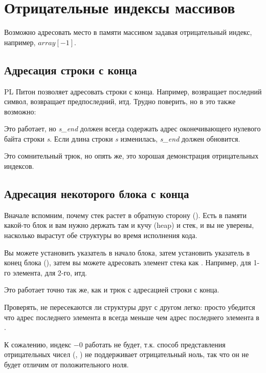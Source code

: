 \section{Отрицательные индексы массивов}
\label{negative_array_indices}

Возможно адресовать место в памяти  массивом задавая отрицательный индекс, например, $array[-1]$.

\subsection{Адресация строки с конца}

\ac{PL} Питон позволяет адресовать строки с конца.
Например,  возвращает последний символ,  возвращает предпоследний, итд.
Трудно поверить, но в \CCpp это также возможно:



Это работает, но \textit{s\_end} должен всегда содержать адрес оконечивающего нулевого байта строки \textit{s}.
Если длина строки \textit{s} изменилась, \textit{s\_end} должен обновится.

Это сомнительный трюк, но опять же, это хорошая демонстрация отрицательных индексов.

\subsection{Адресация некоторого блока с конца}

Вначале вспомним, почему стек растет в обратную сторону ().
Есть в памяти какой-то блок и вам нужно держать там и кучу (heap) и стек, и вы не уверены, насколько вырастут обе
структуры во время исполнения кода.

Вы можете установить указатель  в начало блока,
затем установить указатель  в конец блока (),
затем вы можете адресовать  элемент стека как .
Например,  для 1-го элемента,  для 2-го, итд.

Это работает точно так же, как и трюк с адресацией строки с конца.

Проверять, не пересекаются ли структуры друг с другом легко:
просто убедится что адрес последнего элемента в  всегда меньше чем адрес последнего элемента в .

К сожалению, индекс $-0$ работать не будет,
т.к. способ представления отрицательных чисел (, )
не поддерживает отрицательный ноль,
так что он не будет отличим от положительного ноля.

